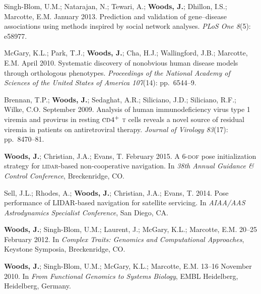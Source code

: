 \documentclass[12pt,letterpaper]{article}
\newcommand{\mhead}[1]{\leavevmode\marginpar{\sffamily\footnotesize #1}}
\begin{document}
{\medskip
\par Singh-Blom, U.M.; Natarajan, N.; Tewari, A.; \textbf{Woods, J.}; Dhillon, I.S.; Marcotte, E.M. January 2013. Prediction and validation of gene--disease associations using methods inspired by social network analyses. \textit{PLoS One 8}(5): e58977.

\medskip
\par McGary, K.L.; Park, T.J.; \textbf{Woods, J.}; Cha, H.J.; Wallingford, J.B.; Marcotte, E.M. April 2010. Systematic discovery of nonobvious human disease models through orthologous phenotypes. \textit{Proceedings of the National Academy of Sciences of the United States of America 107}(14): pp.\ 6544--9.

\medskip
\par Brennan, T.P.; \textbf{Woods, J.}; Sedaghat, A.R.; Siliciano, J.D.; Siliciano, R.F.; Wilke, C.O. September 2009. Analysis of human immunodeficiency virus type 1 viremia and provirus in resting $\textsc{cd4}^{+}$ \textsc{t} cells reveals a novel source of residual viremia in patients on antiretroviral therapy. \textit{Journal of Virology 83}(17): pp.\ 8470--81.

\bigskip
\mhead{Conference \newline Proceedings}%
\par\vspace{-\baselineskip}\textbf{Woods, J.}; Christian, J.A.; Evans, T. February 2015. A \textsc{6-dof} pose initialization strategy for \textsc{lidar}-based non-cooperative navigation. In \textit{38th Annual Guidance \& Control Conference}, Breckenridge, CO.

\medskip
Sell, J.L.; Rhodes, A.; \textbf{Woods, J.}; Christian, J.A.; Evans, T. 2014. Pose performance of LIDAR-based navigation for satellite servicing. In \textit{AIAA/AAS Astrodynamics Specialist Conference}, San Diego, CA.

\bigskip
\mhead{Posters}%
\par\vspace{-\baselineskip}\textbf{Woods, J.}; Singh-Blom, U.M.; Laurent, J.; McGary, K.L.; Marcotte, E.M. 20--25 February 2012. In \textit{Complex Traits: Genomics and Computational Approaches}, Keystone Symposia, Breckenridge, CO.

\medskip
\par \textbf{Woods, J.}; Singh-Blom, U.M.; McGary, K.L.; Marcotte, E.M. 13--16 November 2010. In \textit{From Functional Genomics to Systems Biology},  EMBL Heidelberg, Heidelberg, Germany.

}
\end{document}
